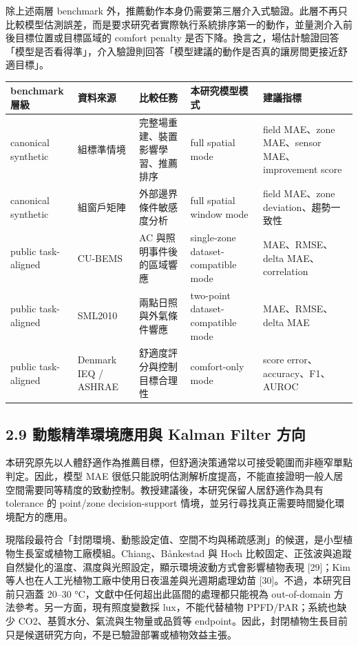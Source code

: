 \documentclass[12pt,a4paper]{article}
\begin{document}
除上述兩層 benchmark 外，推薦動作本身仍需要第三層介入式驗證。此層不再只比較模型估測誤差，而是要求研究者實際執行系統排序第一的動作，並量測介入前後目標位置或目標區域的 comfort penalty 是否下降。換言之，場估計驗證回答「模型是否看得準」，介入驗證則回答「模型建議的動作是否真的讓房間更接近舒適目標」。


\begin{table}[htbp]
\centering
\footnotesize
\renewcommand{\arraystretch}{1.25}
\begin{tabular}{|>{\raggedright\arraybackslash}p{}|>{\raggedright\arraybackslash}p{}|>{\raggedright\arraybackslash}p{}|>{\raggedright\arraybackslash}p{}|>{\raggedright\arraybackslash}p{}|}
\hline
\textbf{benchmark 層級} & \textbf{資料來源} & \textbf{比較任務} & \textbf{本研究模型模式} & \textbf{建議指標} \\
\hline
canonical synthetic & 8 組標準情境 & 完整場重建、裝置影響學習、推薦排序 & full spatial mode & field MAE、zone MAE、sensor MAE、improvement score \\
\hline
canonical synthetic & 48 組窗戶矩陣 & 外部邊界條件敏感度分析 & full spatial window mode & field MAE、zone deviation、趨勢一致性 \\
\hline
public task-aligned & CU-BEMS & AC 與照明事件後的區域響應 & single-zone dataset-compatible mode & MAE、RMSE、delta MAE、correlation \\
\hline
public task-aligned & SML2010 & 兩點日照與外氣條件響應 & two-point dataset-compatible mode & MAE、RMSE、delta MAE \\
\hline
public task-aligned & Denmark IEQ / ASHRAE & 舒適度評分與控制目標合理性 & comfort-only mode & score error、accuracy、F1、AUROC \\
\hline
\end{tabular}
\end{table}

\subsection*{2.9 動態精準環境應用與 Kalman Filter 方向}

本研究原先以人體舒適作為推薦目標，但舒適決策通常以可接受範圍而非極窄單點判定。因此，模型 MAE 很低只能說明估測解析度提高，不能直接證明一般人居空間需要同等精度的致動控制。教授建議後，本研究保留人居舒適作為具有 tolerance 的 point/zone decision-support 情境，並另行尋找真正需要時間變化環境配方的應用。


現階段最符合「封閉環境、動態設定值、空間不均與稀疏感測」的候選，是小型植物生長室或植物工廠模組。Chiang、Bånkestad 與 Hoch 比較固定、正弦波與追蹤自然變化的溫度、濕度與光照設定，顯示環境波動方式會影響植物表現 [29]；Kim 等人也在人工光植物工廠中使用日夜溫差與光週期處理幼苗 [30]。不過，本研究目前只涵蓋 20–30 °C，文獻中任何超出此區間的處理都只能視為 out-of-domain 方法參考。另一方面，現有照度變數採 lux，不能代替植物 PPFD/PAR；系統也缺少 CO2、基質水分、氣流與生物量或品質等 endpoint。因此，封閉植物生長目前只是候選研究方向，不是已驗證部署或植物效益主張。
\end{document}
